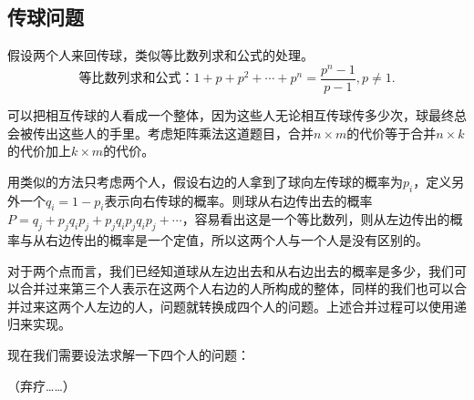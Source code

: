 \subsection{传球问题}
假设两个人来回传球，类似等比数列求和公式的处理。
\begin{equation*}
    等比数列求和公式：1+p+p^2+\cdots+p^n=\frac{p^n-1}{p-1},p\neq 1.
\end{equation*}

可以把相互传球的人看成一个整体，因为这些人无论相互传球传多少次，球最终总会被传出这些人的手里。考虑矩阵乘法这道题目，合并$n\times m$的代价等于合并$n\times k$的代价加上$k\times m$的代价。

用类似的方法只考虑两个人，假设右边的人拿到了球向左传球的概率为$p_i$，定义另外一个$q_i=1-p_i$表示向右传球的概率。则球从右边传出去的概率$P=q_j+p_jq_ip_j+p_jq_ip_jq_ip_j+\cdots$，容易看出这是一个等比数列，则从左边传出的概率与从右边传出的概率是一个定值，所以这两个人与一个人是没有区别的。

对于两个点而言，我们已经知道球从左边出去和从右边出去的概率是多少，我们可以合并过来第三个人表示在这两个人右边的人所构成的整体，同样的我们也可以合并过来这两个人左边的人，问题就转换成四个人的问题。上述合并过程可以使用递归来实现。

现在我们需要设法求解一下四个人的问题：

（弃疗……）

